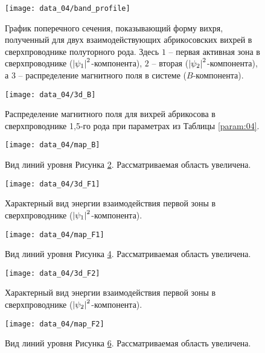 \begin{figure}[h!]
    \center
    \texttt{[image: data\_04/band\_profile]}
    \caption{График поперечного сечения, показывающий форму вихря, полученный 
        для двух взаимодействующих абрикосовских вихрей в сверхпроводнике 
        полуторного рода. Здесь \( 1 \) -- первая активная зона в 
        сверхпроводнике (\( \left| \psi_1 \right|^2 \)-компонента), \( 2 \) -- вторая 
        (\( \left| \psi_2 \right|^2 \)-компонента), а \( 3 \) -- распределение 
        магнитного поля в системе (\( B \)-компонента).}
    \label{img:band-profile-04}
\end{figure}

\begin{figure}[h!]
    \center
    \texttt{[image: data\_04/3d\_B]}
    \caption{Распределение магнитного поля для вихрей абрикосова в 
        сверхпроводнике 1,5-го рода при параметрах из Таблицы \ref{param:04}.}
    \label{img:3d-field-B-04}
\end{figure}

\begin{figure}[h!]
    \center
    \texttt{[image: data\_04/map\_B]}
    \caption{Вид линий уровня Рисунка \ref{img:3d-field-B-04}. 
        Рассматриваемая область увеличена.}
    \label{img:map-field-B-04}
\end{figure}

\begin{figure}[h!]
    \center
    \texttt{[image: data\_04/3d\_F1]}
    \caption{Характерный вид энергии взаимодействия первой зоны в 
        сверхпроводнике (\( \left| \psi_1 \right|^2 \)-компонента).}
    \label{img:3d-band-1-04}
\end{figure}

\begin{figure}[h!]
    \center
    \texttt{[image: data\_04/map\_F1]}
    \caption{Вид линий уровня Рисунка \ref{img:3d-band-1-04}. 
        Рассматриваемая область увеличена.}
    \label{img:map-band-1-04}
\end{figure}

\begin{figure}[h!]
    \center
    \texttt{[image: data\_04/3d\_F2]}
    \caption{Характерный вид энергии взаимодействия первой зоны в 
        сверхпроводнике (\( \left| \psi_2 \right|^2 \)-компонента).}
    \label{img:3d-band-2-04}
\end{figure}

\begin{figure}[h!]
    \center
    \texttt{[image: data\_04/map\_F2]}
    \caption{Вид линий уровня Рисунка \ref{img:3d-band-2-04}. 
        Рассматриваемая область увеличена.}
    \label{img:map-band-2-04}
\end{figure}

